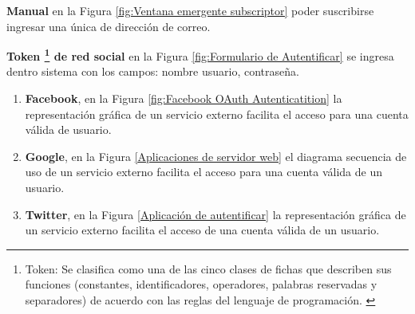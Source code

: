 \textbf{Manual} en la Figura \ref{fig:Ventana emergente subscriptor} poder
suscribirse ingresar una única de dirección de correo.

\begin{minipage}{1.0\textwidth}
	\centering
	\label{fig:Ventana emergente subscriptor}
\end{minipage}

\textbf{Token \footnote{Token: Se clasifica como una de las cinco clases de
fichas que describen sus funciones (constantes, identificadores, operadores,
palabras reservadas y separadores) de acuerdo con las reglas del lenguaje de
programación. \cite{token}} de red social} en la Figura \ref{fig:Formulario
de Autentificar} se ingresa dentro sistema con los campos: nombre 
usuario, contraseña.

\begin{minipage}{1.0\textwidth}
	\centering
	\label{fig:Formulario de Autentificar}
\end{minipage}

\begin{enumerate}

\item \textbf{Facebook}, en la Figura \ref{fig:Facebook OAuth Autenticatition}
la representación gráfica de un servicio externo facilita el acceso para una
cuenta válida de usuario.

\begin{minipage}{1.0\textwidth}
	\centering
	\label{fig:Facebook OAuth Autenticatition}
\end{minipage}

\item \textbf{Google}, en la Figura \ref{Aplicaciones de servidor web} el
diagrama secuencia de uso de un servicio externo facilita el acceso para una
cuenta válida de un usuario.

\begin{minipage}{1.0\textwidth}
	\centering
	\label{Aplicaciones de servidor web}	
\end{minipage}

\item \textbf{Twitter}, en la Figura \ref{Aplicación de autentificar} la
representación gráfica de un servicio externo facilita el acceso de una
cuenta válida de un usuario.

\begin{minipage}{1.0\textwidth}
	\centering
	\label{Aplicación de autentificar}
\end{minipage}

\end{enumerate}
	
